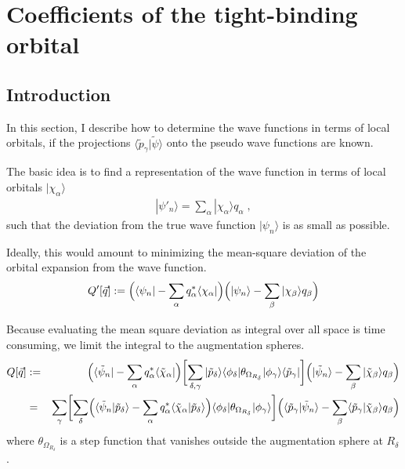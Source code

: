 \documentclass[11pt,a4paper]{report}
\begin{document}
\section{Coefficients of the tight-binding orbital}
\subsection{Introduction}
In this section, I describe how to determine the wave functions in
terms of local orbitals, if the projections
$\langle\tilde{p}_\gamma|\tilde{\psi}\rangle$ onto the pseudo wave
functions are known.

The basic idea is to find a representation of the wave function in
terms of local orbitals $|\chi_\alpha\rangle$
\begin{eqnarray}
|\psi'_n\rangle=\sum_\alpha |\chi_\alpha\rangle q_\alpha\;,
\end{eqnarray}
such that the deviation from the true wave function $|\psi_n\rangle$
is as small as possible.

Ideally, this would amount to minimizing the mean-square deviation of
the orbital expansion from the wave function.
\begin{eqnarray*}
Q'[\vec{q}]:=\Bigl(\langle\psi_n|-\sum_\alpha q^*_\alpha\langle\chi_\alpha|\Bigr)
\Bigl(|\psi_n\rangle-\sum_\beta |\chi_\beta\rangle q_\beta\Bigr)
\end{eqnarray*}

Because evaluating the mean square deviation as integral over all
space is time consuming, we limit the integral to the augmentation
spheres.
\begin{eqnarray}
Q[\vec{q}]&:=&
\Bigl(\langle\tilde{\psi}_n|
-\sum_\alpha q^*_\alpha\langle\tilde{\chi}_\alpha|\Bigr)
\biggl[\sum_{\delta,\gamma}|\tilde{p}_\delta\rangle\langle\phi_\delta|
\theta_{\Omega_{R_\delta}}|\phi_\gamma\rangle\langle\tilde{p}_\gamma|\biggr]
\Bigl(|\tilde{\psi}_n\rangle
-\sum_\beta |\tilde{\chi}_\beta\rangle q_\beta\Bigr)
\nonumber\\
&=&
\sum_{\gamma}
\biggl[
\sum_{\delta}
\Bigl(\langle\tilde{\psi}_n|\tilde{p}_\delta\rangle
-\sum_\alpha q^*_\alpha\langle\tilde{\chi}_\alpha|\tilde{p}_\delta\rangle\Bigr)
\langle\phi_\delta|\theta_{\Omega_{R_\delta}}|\phi_\gamma\rangle
\biggr]
\Bigl(\langle\tilde{p}_\gamma|\tilde{\psi}_n\rangle
-\sum_\beta \langle\tilde{p}_\gamma|\tilde{\chi}_\beta\rangle q_\beta\Bigr)
\end{eqnarray}
where $\theta_{\Omega_{R_\delta}}$ is a step function that vanishes
outside the augmentation sphere at $R_\delta$.
\end{document}

